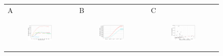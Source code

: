 \documentclass[11pt]{article}
\begin{document}
\begin{figure}[ht]
	\begin{tabular}{lll}
	A&B&C\\
	\begin{subfigure}[t]{0.3\linewidth}
		\centering
		\includegraphics[width=1\linewidth]{figs/figure-2a.pdf} 
	\end{subfigure}&
	\begin{subfigure}[t]{0.3\linewidth}
		\centering
		\includegraphics[width=1\linewidth]{figs/figure-2b.pdf}
	\end{subfigure}&
	\begin{subfigure}[t]{0.3\linewidth}
		\centering
		\includegraphics[width=1\linewidth]{figs/figure-2c.pdf}

\end{subfigure}
\end{tabular}
\end{figure}
\end{document}
